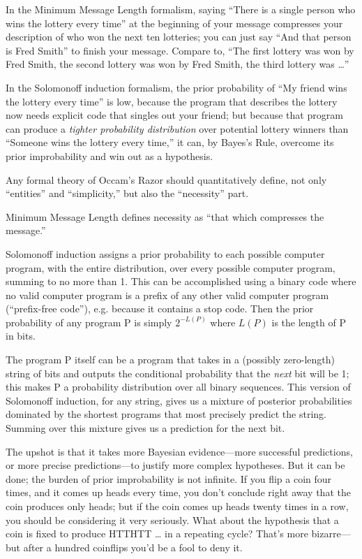 {
 In the Minimum Message Length formalism, saying
``There is a single person who wins the lottery every
time'' at the beginning of your message compresses
your description of who won the next ten lotteries; you can just say
``And that person is Fred Smith'' to
finish your message. Compare to, ``The first lottery
was won by Fred Smith, the second lottery was won by Fred Smith, the
third lottery was \ldots''}

{
 In the Solomonoff induction formalism, the prior probability of
``My friend wins the lottery every
time'' is low, because the program that describes the
lottery now needs explicit code that singles out your friend; but
because that program can produce a \textit{tighter probability
distribution} over potential lottery winners than
``Someone wins the lottery every
time,'' it can, by Bayes's Rule,
overcome its prior improbability and win out as a hypothesis.}

{
 Any formal theory of Occam's Razor should
quantitatively define, not only
``entities'' and
``simplicity,'' but also the
``necessity'' part.}

{
 Minimum Message Length defines necessity as
``that which compresses the
message.''}

{
 Solomonoff induction assigns a prior probability to each possible
computer program, with the entire distribution, over every possible
computer program, summing to no more than 1. This can be accomplished
using a binary code where no valid computer program is a prefix of any
other valid computer program (``prefix-free
code''), e.g. because it contains a stop code. Then
the prior probability of any program P is simply
$2^{-L(P)}$ where $L(P)$ is the length of P in bits.}

{
 The program P itself can be a program that takes in a (possibly
zero-length) string of bits and outputs the conditional probability
that the \textit{next} bit will be 1; this makes P a probability
distribution over all binary sequences. This version of Solomonoff
induction, for any string, gives us a mixture of posterior
probabilities dominated by the shortest programs that most precisely
predict the string. Summing over this mixture gives us a prediction for
the next bit.}

{
 The upshot is that it takes more Bayesian evidence---more
successful predictions, or more precise predictions---to justify more
complex hypotheses. But it can be done; the burden of prior
improbability is not infinite. If you flip a coin four times, and it
comes up heads every time, you don't conclude right
away that the coin produces only heads; but if the coin comes up heads
twenty times in a row, you should be considering it very seriously.
What about the hypothesis that a coin is fixed to produce HTTHTT \ldots
in a repeating cycle? That's more bizarre---but after a
hundred coinflips you'd be a fool to deny it.}


